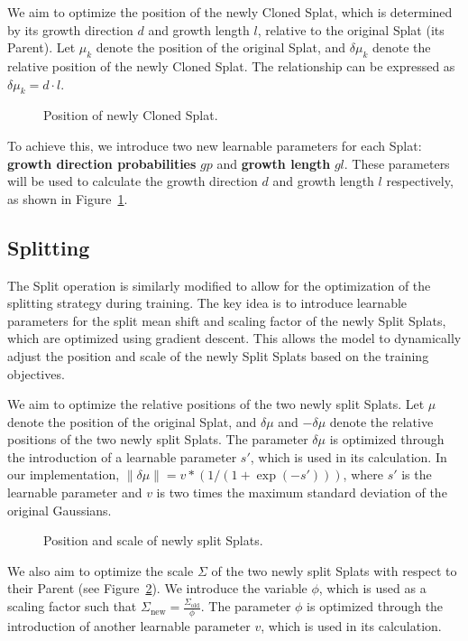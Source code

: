 \documentclass[11pt]{report}
\begin{document}
We aim to optimize the position of the newly Cloned Splat, which is determined by its growth direction $d$ and growth length $l$, relative to the original Splat (its Parent). Let $\mu_k$ denote the position of the original Splat, and $\delta \mu_k$ denote the relative position of the newly Cloned Splat. The relationship can be expressed as $\delta \mu_k = d \cdot l$.
\begin{figure}[htbp]
    \centering
    
    \caption{Position of newly Cloned Splat.}
    \label{fig:clone}
\end{figure}
To achieve this, we introduce two new learnable parameters for each Splat: \textbf{growth direction probabilities} $gp$ and \textbf{growth length} $gl$. These parameters will be used to calculate the growth direction $d$ and growth length $l$ respectively, as shown in Figure~\ref{fig:clone}.

\subsection{Splitting}

The Split operation is similarly modified to allow for the optimization of the splitting strategy during training. The key idea is to introduce learnable parameters for the split mean shift and scaling factor of the newly Split Splats, which are optimized using gradient descent. This allows the model to dynamically adjust the position and scale of the newly Split Splats based on the training objectives.

We aim to optimize the relative positions of the two newly split Splats. Let $\mu$ denote the position of the original Splat, and $\delta \mu$ and $- \delta \mu$ denote the relative positions of the two newly split Splats. The parameter $\delta \mu$ is optimized through the introduction of a learnable parameter $s'$, which is used in its calculation. In our implementation, $\|\delta \mu \| = v * (1 / (1 + \exp(-s'))) $, where $s'$ is the learnable parameter and $v$ is two times the maximum standard deviation of the original Gaussians.

\begin{figure}[htbp]
    \centering
    
    \caption{Position and scale of newly split Splats.}
    \label{fig:split}
\end{figure}

We also aim to optimize the scale $\Sigma$ of the two newly split Splats with respect to their Parent (see Figure~\ref{fig:split}). We introduce the variable $\phi$, which is used as a scaling factor such that $\Sigma_{\text{new}} = \frac{\Sigma_{\text{old}}}{\phi}$. The parameter $\phi$ is optimized through the introduction of another learnable parameter $v$, which is used in its calculation.
\end{document}
